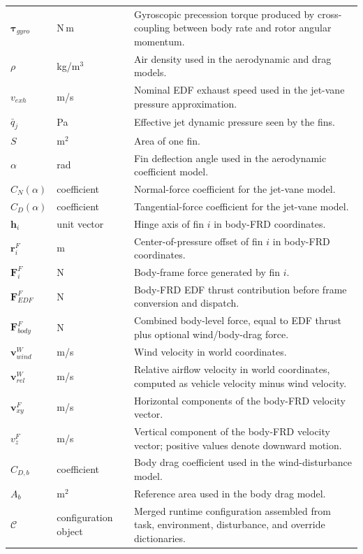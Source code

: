 \documentclass[10pt,twocolumn]{article}
\begin{document}
\begin{table}[!t]
\begin{tabularx}{\textwidth}{@{}p{1.25in}p{1.50in}X@{}}
$\boldsymbol{\tau}_{gyro}$ & N\,m & Gyroscopic precession torque produced by cross-coupling between body rate and rotor angular momentum. \\
$\rho$ & kg/m$^3$ & Air density used in the aerodynamic and drag models. \\
$v_{exh}$ & m/s & Nominal EDF exhaust speed used in the jet-vane pressure approximation. \\
$\bar{q}_{j}$ & Pa & Effective jet dynamic pressure seen by the fins. \\
$S$ & m$^2$ & Area of one fin. \\
$\alpha$ & rad & Fin deflection angle used in the aerodynamic coefficient model. \\
$C_N(\alpha)$ & coefficient & Normal-force coefficient for the jet-vane model. \\
$C_D(\alpha)$ & coefficient & Tangential-force coefficient for the jet-vane model. \\
$\mathbf{h}_i$ & unit vector & Hinge axis of fin $i$ in body-FRD coordinates. \\
$\mathbf{r}_i^{F}$ & m & Center-of-pressure offset of fin $i$ in body-FRD coordinates. \\
$\mathbf{F}_{i}^{F}$ & N & Body-frame force generated by fin $i$. \\
$\mathbf{F}_{EDF}^{F}$ & N & Body-FRD EDF thrust contribution before frame conversion and dispatch. \\
$\mathbf{F}_{body}^{F}$ & N & Combined body-level force, equal to EDF thrust plus optional wind/body-drag force. \\
$\mathbf{v}^{W}_{wind}$ & m/s & Wind velocity in world coordinates. \\
$\mathbf{v}^{W}_{rel}$ & m/s & Relative airflow velocity in world coordinates, computed as vehicle velocity minus wind velocity. \\
$\mathbf{v}_{xy}^{F}$ & m/s & Horizontal components of the body-FRD velocity vector. \\
$v_z^{F}$ & m/s & Vertical component of the body-FRD velocity vector; positive values denote downward motion. \\
$C_{D,b}$ & coefficient & Body drag coefficient used in the wind-disturbance model. \\
$A_b$ & m$^2$ & Reference area used in the body drag model. \\
$\mathcal{C}$ & configuration object & Merged runtime configuration assembled from task, environment, disturbance, and override dictionaries. \\

\end{tabularx}
\end{table}
\end{document}
